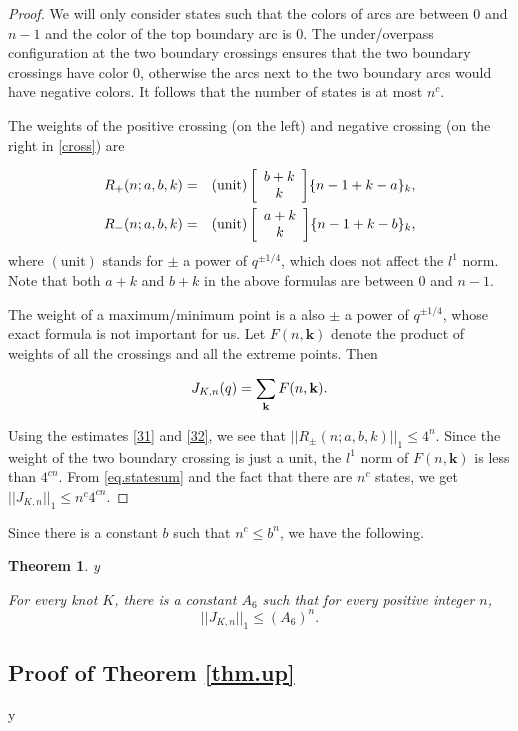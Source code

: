 \documentclass{amsart}
\newtheorem{theorem}{Theorem}[section]
\theoremstyle{definition}
\def\printname#1{
    \if\draft y
        \smash{\makebox[0pt]{\hspace{-0.5in}
            \raisebox{8pt}{\tt\tiny #1}}}
    \fi
}
\newcommand{\qbinom}[2]{\text{$\left[\begin{array}{c}#1\\ #2\end{array}
\right]$}}
\def\lbl#1{\label{#1}\printname{#1}}
\def\bk{\mathbf{k}}
\begin{document}
\begin{proof}
We will only consider states such that  the colors of arcs are
between 0 and $n-1$ and the color of the top boundary arc is 0. The
under/overpass configuration at the two boundary crossings ensures
that the two boundary crossings have color 0, otherwise the arcs
next to the two boundary arcs would have negative colors. It follows
that the number of states is at most $n^c$.

The weights of the positive crossing  (on the left) and negative
crossing (on the right in \eqref{cross}) are

\begin{eqnarray}
\lbl{eq.R+-} R_+(n;a,b,k) &=&  (\text{unit})\,
\qbinom{b+k}{k} \{n-1+k-a\}_k, \\
R_- (n;a,b,k) &=& (\text{unit})\,\qbinom{a+k}{k} \{n-1+k-b\}_k,
\end{eqnarray}
where $(\text{unit})$ stands for $\pm$ a power of $q^{\pm 1/4}$,
which does not affect the $l^1$ norm. Note that both $a+k$ and $b+k$
in the above formulas are between $0$ and $n-1$.


The weight of a maximum/minimum point is a also $\pm$  a power of
$q^{\pm 1/4}$, whose exact formula is not important for us.  Let
$F(n,\bk)$ denote the product of weights of all the crossings and
all the extreme points. Then

\begin{equation}
\lbl{eq.statesum}
J_{K,n}(q)=\sum_{\bk} F(n,\bk).
\end{equation}


 Using the estimates \eqref{31} and \eqref{32}, we see
that $||R_{\pm}(n;a,b,k)||_1 \leq 4^n$. Since the weight of the two
boundary crossing is just a unit, the $l^1$ norm of $F(n,\bk)$ is
less than $4^{cn}$. From \eqref{eq.statesum} and the fact that there
are $n^c$ states, we get  $ ||J_{K,n}||_1 \le n^c 4^{cn}$.
\end{proof}

Since there is a constant $b$ such that $n^c \le b^n$, we have the
following.

\begin{theorem}
\lbl{95}
For every knot $K$, there is a constant $A_6$ such
that for every positive integer $n$,
$$ ||J_{K,n}||_1 \le (A_6)^n.$$
\end{theorem}


\subsection{Proof of Theorem \ref{thm.up}}
\lbl{sub.thmup}
\end{document}
